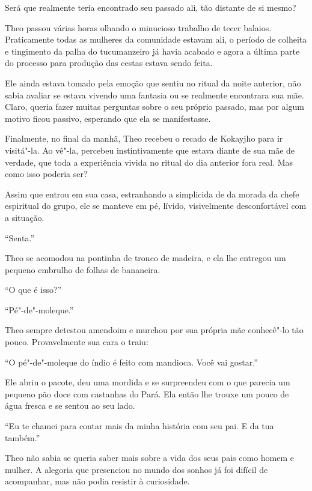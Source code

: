 Será que realmente teria encontrado seu passado ali, tão distante de si
mesmo?

\asterisc


Theo passou várias horas olhando o minucioso trabalho de tecer balaios.
Praticamente todas as mulheres da comunidade estavam ali, o período de
colheita e tingimento da palha do tucumanzeiro já havia acabado e agora
a última parte do processo para produção das cestas estava sendo feita.

Ele ainda estava tomado pela emoção que sentiu no ritual da noite
anterior, não sabia avaliar se estava vivendo uma fantasia ou se realmente
encontrara sua mãe. Claro, queria fazer muitas perguntas sobre o seu
próprio passado, mas por algum motivo ficou passivo, esperando que ela
se manifestasse.

Finalmente, no final da manhã, Theo recebeu o recado de Kokayjho para ir visitá"-la. Ao vê"-la,
percebeu instintivamente que estava diante de sua mãe de verdade, que toda a experiência vivida no ritual do dia
anterior fora real. Mas como isso poderia ser?

Assim que entrou em sua casa, estranhando a simplicida															de da morada da
chefe espiritual do grupo, ele se manteve em pé, lívido, visivelmente
desconfortável com a situação.

``Senta.''

Theo se acomodou na pontinha de tronco de madeira, e ela lhe entregou um
pequeno embrulho de folhas de bananeira.

``O que é isso?''

``Pé"-de"-moleque.''

Theo sempre detestou amendoim e murchou por sua própria mãe conhecê"-lo
tão pouco. Provavelmente sua cara o traiu:

``O pé"-de"-moleque do índio é feito com mandioca. Você vai gostar.''

Ele abriu o pacote, deu uma mordida e se surpreendeu com o que parecia
um pequeno pão doce com castanhas do Pará. Ela então lhe trouxe um pouco
de água fresca e se sentou ao seu lado.

``Eu te chamei para contar mais da minha história com seu pai. E da tua
também.''

Theo não sabia se queria saber mais sobre a vida dos seus pais como
homem e mulher. A alegoria que presenciou no mundo dos sonhos já foi
difícil de acompanhar, mas não podia resistir à curiosidade.

